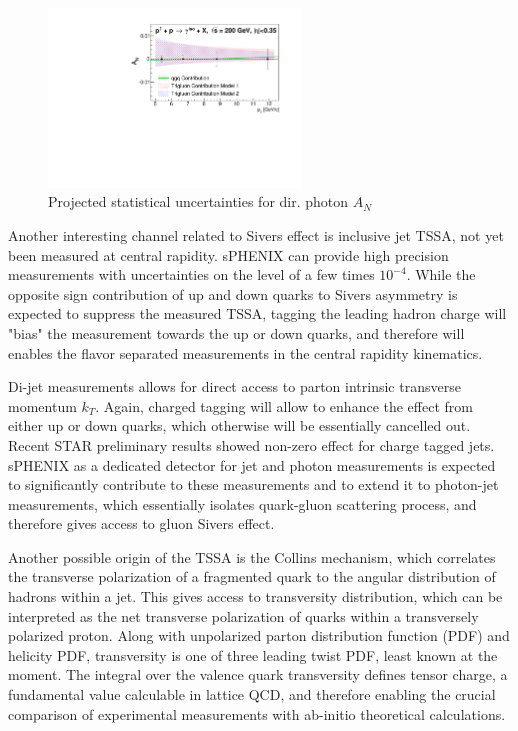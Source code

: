 \begin{figure}[htbp]
\centering
\includegraphics[width=0.60\textwidth]{figs/AN_dp_sphenix.pdf}
\caption{Projected statistical uncertainties for dir. photon $A_N$}
\label{fig:AN_dp}
\end{figure}

Another interesting channel related to Sivers effect is inclusive jet TSSA, not yet been measured at central rapidity. sPHENIX can provide high precision measurements with uncertainties on the level of a few times $10^{-4}$. While the opposite sign contribution of up and down quarks to Sivers asymmetry is expected to suppress the measured TSSA, tagging the leading hadron charge will "bias" the measurement towards the up or down quarks, and therefore will enables the flavor separated measurements in the central rapidity kinematics.

Di-jet measurements allows for direct access to parton intrinsic transverse momentum $k_T$. Again, charged tagging will allow to enhance the effect from either up or down quarks, which otherwise will be essentially cancelled out. Recent STAR preliminary results showed non-zero effect for charge tagged jets. sPHENIX as a dedicated detector for jet and photon measurements is expected to significantly contribute to these measurements and to extend it to photon-jet measurements, which essentially isolates quark-gluon scattering process, and therefore gives access to gluon Sivers effect.

Another possible origin of the TSSA is the Collins mechanism, which correlates the transverse polarization of a fragmented quark to the angular distribution of hadrons within a jet. This gives access to transversity distribution, which can be interpreted as the net transverse polarization of quarks within a transversely polarized proton. Along with unpolarized parton distribution function (PDF) and helicity PDF, transversity is one of three leading twist PDF, least known at the moment. The integral over the valence quark transversity defines tensor charge, a fundamental value calculable in lattice QCD, and therefore enabling the crucial comparison of experimental measurements with ab-initio theoretical calculations.

